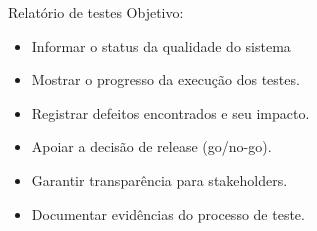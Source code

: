 
\begin{frame}{Relatório de testes}
    Objetivo:
    \begin{itemize}
        \item Informar o status da qualidade do sistema
        \item Mostrar o progresso da execução dos testes.
        \item Registrar defeitos encontrados e seu impacto.
        \item Apoiar a decisão de release (go/no-go).
        \item Garantir transparência para stakeholders.
        \item Documentar evidências do processo de teste.
    \end{itemize}
\end{frame}
